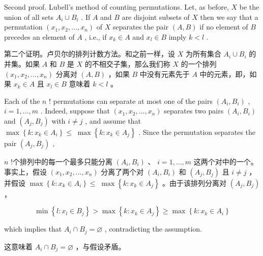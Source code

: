 \documentclass[10pt]{article}
\begin{document}
Second proof. Lubell's method of counting permutations. Let, as before, \(X\) be the union of all sets \({A}_{i} \cup  {B}_{i}\) . If \(A\) and \(B\) are disjoint subsets of \(X\) then we say that a permutation \(\left( {{x}_{1},{x}_{2},\ldots ,{x}_{n}}\right)\) of \(X\) separates the pair \(\left( {A,B}\right)\) if no element of \(B\) precedes an element of \(A\) , i.e., if \({x}_{k} \in  A\) and \({x}_{l} \in  B\) imply \(k < l\) .

\begin{tcolorbox}\relax
第二个证明。卢贝尔的排列计数方法。和之前一样，设 \(X\) 为所有集合 \({A}_{i} \cup  {B}_{i}\) 的并集。如果 \(A\) 和 \(B\) 是 \(X\) 的不相交子集，那么我们称 \(X\) 的一个排列 \(\left( {{x}_{1},{x}_{2},\ldots ,{x}_{n}}\right)\) 分离对 \(\left( {A,B}\right)\) ，如果 \(B\) 中没有元素先于 \(A\) 中的元素，即，如果 \({x}_{k} \in  A\) 且 \({x}_{l} \in  B\) 意味着 \(k < l\) 。
\end{tcolorbox}

Each of the \(n\) ! permutations can separate at most one of the pairs \(\left( {{A}_{i},{B}_{i}}\right)\) , \(i = 1,\ldots ,m\) . Indeed, suppose that \(\left( {{x}_{1},{x}_{2},\ldots ,{x}_{n}}\right)\) separates two pairs \(\left( {{A}_{i},{B}_{i}}\right)\) and \(\left( {{A}_{j},{B}_{j}}\right)\) with \(i \neq  j\) , and assume that \(\max \left\{  {k : {x}_{k} \in  {A}_{i}}\right\}   \leq \; \max \left\{  {k : {x}_{k} \in  {A}_{j}}\right\}\) . Since the permutation separates the pair \(\left( {{A}_{j},{B}_{j}}\right)\) ,

\begin{tcolorbox}\relax
\(n\) !个排列中的每一个最多只能分离 \(\left( {{A}_{i},{B}_{i}}\right)\) 、 \(i = 1,\ldots ,m\) 这两个对中的一个。事实上，假设 \(\left( {{x}_{1},{x}_{2},\ldots ,{x}_{n}}\right)\) 分离了两个对 \(\left( {{A}_{i},{B}_{i}}\right)\) 和 \(\left( {{A}_{j},{B}_{j}}\right)\) 且 \(i \neq  j\) ，并假设 \(\max \left\{  {k : {x}_{k} \in  {A}_{i}}\right\}   \leq \; \max \left\{  {k : {x}_{k} \in  {A}_{j}}\right\}\) 。由于该排列分离对 \(\left( {{A}_{j},{B}_{j}}\right)\) ，
\end{tcolorbox}

\[
\min \left\{  {l : {x}_{l} \in  {B}_{j}}\right\}   > \max \left\{  {k : {x}_{k} \in  {A}_{j}}\right\}   \geq  \max \left\{  {k : {x}_{k} \in  {A}_{i}}\right\}
\]

which implies that \({A}_{i} \cap  {B}_{j} = \varnothing\) , contradicting the assumption.

\begin{tcolorbox}\relax
这意味着 \({A}_{i} \cap  {B}_{j} = \varnothing\) ，与假设矛盾。
\end{tcolorbox}
\end{document}
